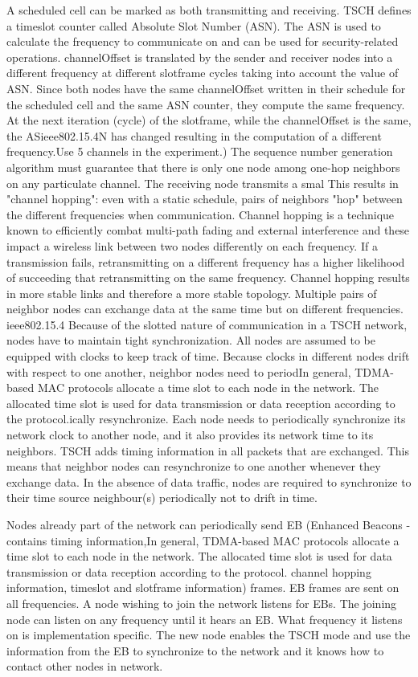 A scheduled cell can be marked as both transmitting and receiving. TSCH defines a timeslot counter called Absolute Slot Number (ASN). The ASN is used to calculate the frequency to communicate on and can be used for security-related operations. channelOffset is translated by the sender and receiver nodes into a different frequency at different slotframe cycles taking into account the value of ASN. Since both nodes have the same channelOffset written in their schedule for the scheduled cell and the same ASN counter, they compute the same frequency. At the next iteration (cycle) of the slotframe, while the channelOffset is the same, the ASieee802.15.4N has changed resulting in the computation of a different frequency.Use 5 channels in the experiment.) The sequence number generation algorithm must guarantee that there is only one node among one-hop neighbors on any particulate channel. The receiving node transmits a smal This results in "channel hopping": even with a static schedule, pairs of neighbors "hop" between the different frequencies when communication. Channel hopping is a technique known to efficiently combat multi-path fading and external interference and these impact a wireless link between two nodes differently on each frequency. If a transmission fails, retransmitting on a different frequency has a higher likelihood of succeeding that retransmitting on the same frequency. Channel hopping results in more stable links and therefore a more stable topology. Multiple pairs of neighbor nodes can exchange data at the same time but on different frequencies.
ieee802.15.4
Because of the slotted nature of communication in a TSCH network, nodes have to maintain tight synchronization. All nodes are assumed to be equipped with clocks to keep track of time. Because clocks in different nodes drift with respect to one another, neighbor nodes need to periodIn general, TDMA-based MAC protocols allocate a time slot to each node in the network. The allocated time slot is used for data transmission or data reception according to the protocol.ically resynchronize. Each node needs to periodically synchronize its network clock to another node, and it also provides its network time to its neighbors. TSCH adds timing information in all packets that are exchanged. This means that neighbor nodes can resynchronize to one another whenever they exchange data. In the absence of data traffic, nodes are required to synchronize to their time source neighbour(s) periodically not to drift in time. 

Nodes already part of the network can periodically send EB (Enhanced Beacons - contains timing information,In general, TDMA-based MAC protocols allocate a time slot to each node in the network. The allocated time slot is used for data transmission or data reception according to the protocol. channel hopping information, timeslot and slotframe information) frames. EB frames are sent on all  frequencies. A node wishing to join the network listens for EBs. The joining node can listen on any frequency until it hears an EB. What frequency it listens on is implementation specific. The new node enables the TSCH mode and use the information from the EB to synchronize to the network and it knows how to contact other nodes in network. \cite{tsch}

